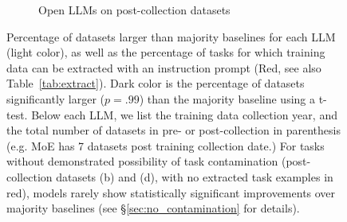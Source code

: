 \documentclass[letterpaper]{article} %
\begin{document}
\begin{figure}[t]
\begin{subfigure}[b]{0.45\textwidth}
            \caption[]%
            {Open LLMs on post-collection datasets}    
            \label{fig:Few shot performance for old datasets2}
        \end{subfigure}
        \caption[]
        {Percentage of datasets larger than majority baselines for each LLM (light color), as well as the percentage of tasks for which training data can be extracted with an instruction prompt (Red, see also Table~\ref{tab:extract}). Dark color is the percentage of datasets significantly larger ($p=.99$) than the majority baseline using a t-test. Below each LLM, we list the training data collection year, and the total number of datasets in pre- or post-collection in parenthesis (e.g. MoE has 7 datasets post training collection date.)  For tasks without demonstrated possibility of task contamination (post-collection datasets (b) and (d), with no extracted task examples in red), models rarely show statistically significant improvements over majority baselines (see \S\ref{sec:no_contamination} for details).}
        \label{fig:experiments-majority}
    \end{figure}
\end{document}
